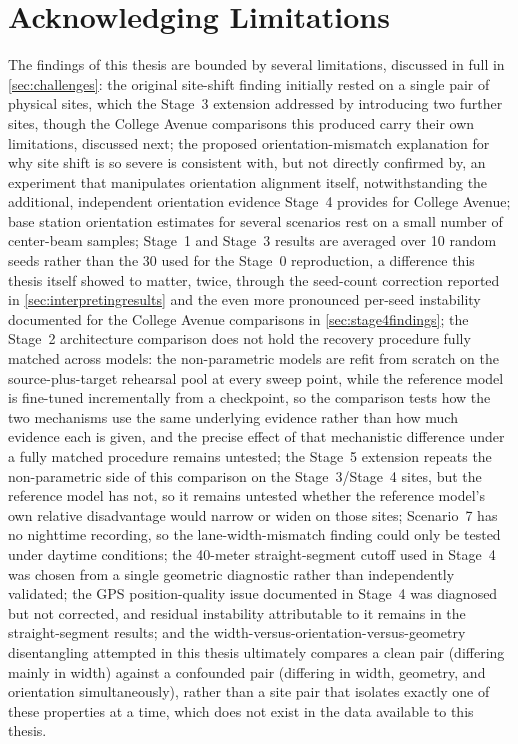 \documentclass{iutbscthesis}
\begin{document}
\section{Acknowledging Limitations}

The findings of this thesis are bounded by several limitations, discussed in full in \autoref{sec:challenges}: the original site-shift finding initially rested on a single pair of physical sites, which the Stage~3 extension addressed by introducing two further sites, though the College Avenue comparisons this produced carry their own limitations, discussed next; the proposed orientation-mismatch explanation for why site shift is so severe is consistent with, but not directly confirmed by, an experiment that manipulates orientation alignment itself, notwithstanding the additional, independent orientation evidence Stage~4 provides for College Avenue; base station orientation estimates for several scenarios rest on a small number of center-beam samples; Stage~1 and Stage~3 results are averaged over 10 random seeds rather than the 30 used for the Stage~0 reproduction, a difference this thesis itself showed to matter, twice, through the seed-count correction reported in \autoref{sec:interpretingresults} and the even more pronounced per-seed instability documented for the College Avenue comparisons in \autoref{sec:stage4findings}; the Stage~2 architecture comparison does not hold the recovery procedure fully matched across models: the non-parametric models are refit from scratch on the source-plus-target rehearsal pool at every sweep point, while the reference model is fine-tuned incrementally from a checkpoint, so the comparison tests how the two mechanisms use the same underlying evidence rather than how much evidence each is given, and the precise effect of that mechanistic difference under a fully matched procedure remains untested; the Stage~5 extension repeats the non-parametric side of this comparison on the Stage~3/Stage~4 sites, but the reference model has not, so it remains untested whether the reference model's own relative disadvantage would narrow or widen on those sites; Scenario~7 has no nighttime recording, so the lane-width-mismatch finding could only be tested under daytime conditions; the 40-meter straight-segment cutoff used in Stage~4 was chosen from a single geometric diagnostic rather than independently validated; the GPS position-quality issue documented in Stage~4 was diagnosed but not corrected, and residual instability attributable to it remains in the straight-segment results; and the width-versus-orientation-versus-geometry disentangling attempted in this thesis ultimately compares a clean pair (differing mainly in width) against a confounded pair (differing in width, geometry, and orientation simultaneously), rather than a site pair that isolates exactly one of these properties at a time, which does not exist in the data available to this thesis.
\end{document}
